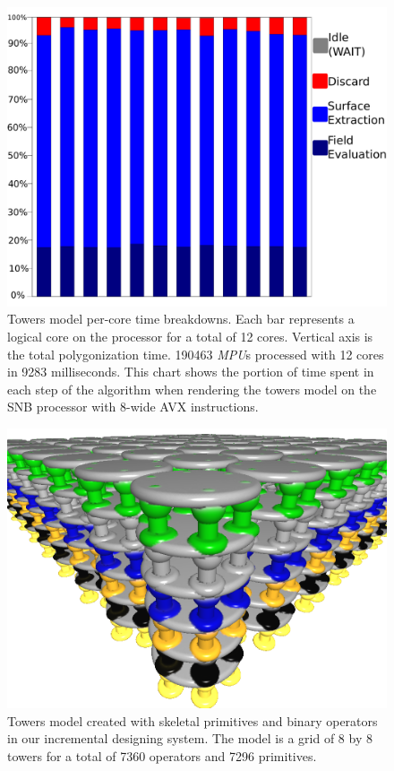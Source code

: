 \begin{figure}[htb]
  \centering
  \includegraphics[width = 1.0\linewidth]{figures/cpupoly/PerCoreTimeBreakDown.pdf}
  \caption{\label{fig:TowerSNBTimeBreakDown}
  {Towers model per-core time breakdowns. Each bar represents a logical core on the processor for a total of 12 cores. 
  Vertical axis is the total polygonization time. 190463 \textit{MPU}s processed with 12 cores in 9283 milliseconds. 
  This chart shows the portion of time spent in each step of the algorithm when rendering the towers model on the 
  SNB processor with 8-wide AVX instructions.}
}
\end{figure}

\begin{figure}[htb]
  \centering
  \includegraphics[height = 0.8\linewidth]{figures/cpupoly/towers64}
  \caption{\label{fig:ModelTower}
  {Towers model created with skeletal primitives and binary operators in 
  our incremental designing system. The model is a grid of 8 by 8 towers for a total of
  7360 operators and 7296 primitives.}
}
\end{figure}

